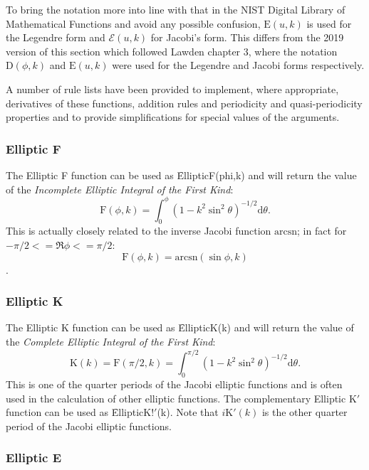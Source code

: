 To bring the notation more into line with that in the NIST Digital Library of
Mathematical Functions and avoid any possible confusion, $\mathrm{E}(u, k)$ is used for
the Legendre form and $\mathcal{E}(u, k)$ for Jacobi's form.
This differs from the 2019 version of this section which followed Lawden
\cite{Lawden:89} chapter 3, where the notation $\mathrm{D}(\phi, k)$ and
$\mathrm{E}(u, k)$ were used for the Legendre and Jacobi forms respectively.

A number of rule lists have been provided to implement, where appropriate,
derivatives of these functions, addition rules and periodicity and
quasi-periodicity properties and to provide simplifications for special values
of the arguments.

\subsubsection{Elliptic F}
\hypertarget{operator:ELLIPTICF}{}

The Elliptic F function can be used as \f{EllipticF(phi,k)} and
will return the value of the \emph{Incomplete Elliptic Integral of the
First Kind}:
\[\mathrm{F}(\phi, k)=\int_0^\phi(1-k^2 \sin^2 \theta)^{-1/2} \mathrm{d}\theta.\]
This is actually closely related to the inverse Jacobi function
$\mathrm{arcsn}$; in fact for $-\pi/2 <= \Re \phi <=\pi/2$:
\[ \mathrm{F}(\phi, k) = \mathrm{arcsn}(\sin \phi, k) \].
  
\subsubsection{Elliptic K}
\hypertarget{operator:ELLIPTICK}{}
\hypertarget{operator:ELLIPTICK'}{}

The Elliptic K function can be used as \f{EllipticK(k)} and will
return the value of the \emph{Complete Elliptic Integral of the
First Kind}:
\[\mathrm{K}(k)=\mathrm{F}(\pi/2, k) =\int_0^{\pi/2}(1-k^2 \sin^2 \theta)^{-1/2}\mathrm{d}\theta.\]
This is one of the quarter periods of the Jacobi elliptic
functions and is often used in the calculation of other elliptic functions.
The complementary Elliptic K$'$ function can be used as \f{EllipticK!$'$(k)}.
Note that $i\mathrm{K}'(k)$ is the other quarter period of the Jacobi
elliptic functions.  

\subsubsection{Elliptic E}
\hypertarget{operator:ELLIPTICE}{}
\hypertarget{operator:ELLIPTICE'}{}

